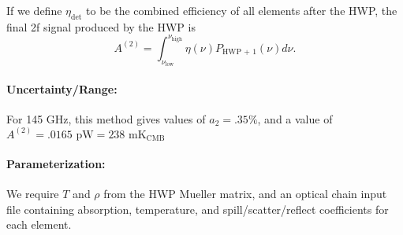 If we define $\eta_\text{det}$ to be the combined efficiency of all elements after the HWP,
the final 2f signal produced by the HWP is 
\[
A^{(2)} = \int_{\nu_\text{low}}^{\nu_\text{high}} \eta(\nu) P_\text{HWP + 1}(\nu) d\nu.
\]
\paragraph{Uncertainty/Range:}
For 145 GHz, this method gives values of $a_2 = .35\%$, and a value of $A^{(2)} = .0165 \text{ pW} = 238 \text{ mK}_\text{CMB}$

\paragraph{Parameterization:}
We require $T$ and $\rho$ from the HWP Mueller matrix\cite{Salatino16}, and an optical chain input file containing
absorption, temperature, and spill/scatter/reflect coefficients for each element.

